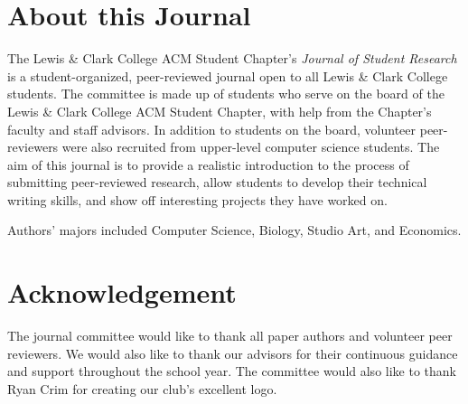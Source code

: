 \documentclass[12pt, letterpaper]{article}
\begin{document}
\section{About this Journal}
The Lewis \& Clark College ACM Student Chapter's \textit{Journal of Student Research} is a student-organized, peer-reviewed journal open to all Lewis \& Clark College students. The committee is made up of students who serve on the board of the Lewis \& Clark College ACM Student Chapter, with help from the Chapter's faculty and staff advisors. In addition to students on the board, volunteer peer-reviewers were also recruited from upper-level computer science students. The aim of this journal is to provide a realistic introduction to the process of submitting peer-reviewed research, allow students to develop their technical writing skills, and show off interesting projects they have worked on.

Authors' majors included Computer Science, Biology, Studio Art, and Economics.


\section{Acknowledgement}

The journal committee would like to thank all paper authors and volunteer peer reviewers. We would also like to thank our advisors for their continuous guidance and support throughout the school year. The committee would also like to thank Ryan Crim for creating our club's excellent logo.


\newpage
\end{document}

